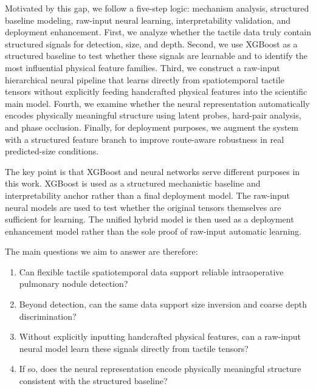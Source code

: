 Motivated by this gap, we follow a five-step logic: mechanism analysis, structured baseline modeling, raw-input neural learning, interpretability validation, and deployment enhancement. First, we analyze whether the tactile data truly contain structured signals for detection, size, and depth. Second, we use XGBoost as a structured baseline to test whether these signals are learnable and to identify the most influential physical feature families. Third, we construct a raw-input hierarchical neural pipeline that learns directly from spatiotemporal tactile tensors without explicitly feeding handcrafted physical features into the scientific main model. Fourth, we examine whether the neural representation automatically encodes physically meaningful structure using latent probes, hard-pair analysis, and phase occlusion. Finally, for deployment purposes, we augment the system with a structured feature branch to improve route-aware robustness in real predicted-size conditions.

The key point is that XGBoost and neural networks serve different purposes in this work. XGBoost is used as a structured mechanistic baseline and interpretability anchor rather than a final deployment model. The raw-input neural models are used to test whether the original tensors themselves are sufficient for learning. The unified hybrid model is then used as a deployment enhancement model rather than the sole proof of raw-input automatic learning.

The main questions we aim to answer are therefore:
\begin{enumerate}[leftmargin=18pt]
\item Can flexible tactile spatiotemporal data support reliable intraoperative pulmonary nodule detection?
\item Beyond detection, can the same data support size inversion and coarse depth discrimination?
\item Without explicitly inputting handcrafted physical features, can a raw-input neural model learn these signals directly from tactile tensors?
\item If so, does the neural representation encode physically meaningful structure consistent with the structured baseline?
\end{enumerate}

